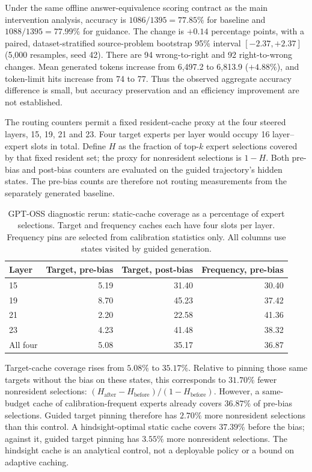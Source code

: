 \documentclass[12pt,a4paper,twoside,openright]{book}
\begin{document}
Under the same offline answer-equivalence scoring contract as the main
intervention analysis, accuracy is $1086/1395=77.85\%$ for baseline and
$1088/1395=77.99\%$ for guidance. The change is $+0.14$ percentage points,
with a paired, dataset-stratified source-problem bootstrap 95\% interval
$[-2.37,+2.37]$ (5,000 resamples, seed 42). There are 94 wrong-to-right and
92 right-to-wrong changes. Mean generated tokens increase from 6,497.2 to
6,813.9 ($+4.88\%$), and token-limit hits increase from 74 to 77.
Thus the observed aggregate accuracy difference is small, but accuracy
preservation and an efficiency improvement are not established.

The routing counters permit a fixed resident-cache proxy at the four steered
layers, 15, 19, 21 and 23. Four target experts per layer would occupy 16
layer--expert slots in total. Define $H$ as the fraction of top-$k$ expert
selections covered by that fixed resident set; the proxy for nonresident
selections is $1-H$. Both pre-bias and post-bias counters are evaluated on
the guided trajectory's hidden states. The pre-bias counts are therefore
not routing measurements from the separately generated baseline.

\begin{table}[ht]
\centering\small
\caption{GPT-OSS diagnostic rerun: static-cache coverage as a percentage of
expert selections. Target and frequency caches each have four slots per layer.
Frequency pins are selected from calibration statistics only. All columns
use states visited by guided generation.}
\label{tab:oss-cache-coverage}
\begin{tabular}{lrrr}
\toprule
Layer & Target, pre-bias & Target, post-bias & Frequency, pre-bias \\
\midrule
15 & 5.19 & 31.40 & 30.40 \\
19 & 8.70 & 45.23 & 37.42 \\
21 & 2.20 & 22.58 & 41.36 \\
23 & 4.23 & 41.48 & 38.32 \\
All four & 5.08 & 35.17 & 36.87 \\
\bottomrule
\end{tabular}
\end{table}

Target-cache coverage rises from $5.08\%$ to $35.17\%$. Relative to pinning
those same targets without the bias on these states, this corresponds to
$31.70\%$ fewer nonresident selections:
$(H_{\mathrm{after}}-H_{\mathrm{before}})/(1-H_{\mathrm{before}})$.
However, a same-budget cache of calibration-frequent experts already covers
$36.87\%$ of pre-bias selections. Guided target pinning therefore has
$2.70\%$ more nonresident selections than this control. A hindsight-optimal
static cache covers $37.39\%$ before the bias; against it, guided target
pinning has $3.55\%$ more nonresident selections. The hindsight cache is an
analytical control, not a deployable policy or a bound on adaptive caching.
\end{document}
